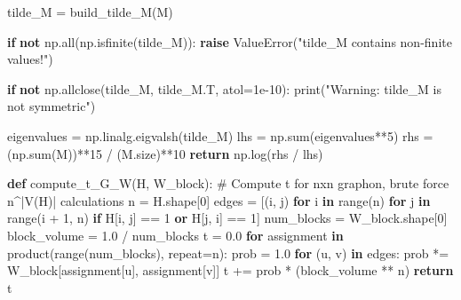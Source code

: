 \documentclass[
  letterpaper,
  DIV=11,
  numbers=noendperiod]{scrartcl}
\newenvironment{Shaded}{\begin{snugshade}}{\end{snugshade}}
\newcommand{\BuiltInTok}[1]{\textcolor[rgb]{0.00,0.23,0.31}{#1}}
\newcommand{\CommentTok}[1]{\textcolor[rgb]{0.37,0.37,0.37}{#1}}
\newcommand{\ControlFlowTok}[1]{\textcolor[rgb]{0.00,0.23,0.31}{\textbf{#1}}}
\newcommand{\DecValTok}[1]{\textcolor[rgb]{0.68,0.00,0.00}{#1}}
\newcommand{\FloatTok}[1]{\textcolor[rgb]{0.68,0.00,0.00}{#1}}
\newcommand{\KeywordTok}[1]{\textcolor[rgb]{0.00,0.23,0.31}{\textbf{#1}}}
\newcommand{\NormalTok}[1]{\textcolor[rgb]{0.00,0.23,0.31}{#1}}
\newcommand{\OperatorTok}[1]{\textcolor[rgb]{0.37,0.37,0.37}{#1}}
\newcommand{\PreprocessorTok}[1]{\textcolor[rgb]{0.68,0.00,0.00}{#1}}
\newcommand{\StringTok}[1]{\textcolor[rgb]{0.13,0.47,0.30}{#1}}
\begin{document}
\begin{Shaded}
\begin{Highlighting}[]
\NormalTok{    tilde\_M }\OperatorTok{=}\NormalTok{ build\_tilde\_M(M)}

    \ControlFlowTok{if} \KeywordTok{not}\NormalTok{ np.}\BuiltInTok{all}\NormalTok{(np.isfinite(tilde\_M)):}
        \ControlFlowTok{raise} \PreprocessorTok{ValueError}\NormalTok{(}\StringTok{"tilde\_M contains non{-}finite values!"}\NormalTok{)}

    \ControlFlowTok{if} \KeywordTok{not}\NormalTok{ np.allclose(tilde\_M, tilde\_M.T, atol}\OperatorTok{=}\FloatTok{1e{-}10}\NormalTok{):}
        \BuiltInTok{print}\NormalTok{(}\StringTok{"Warning: tilde\_M is not symmetric"}\NormalTok{)}

\NormalTok{    eigenvalues }\OperatorTok{=}\NormalTok{ np.linalg.eigvalsh(tilde\_M)}
\NormalTok{    lhs }\OperatorTok{=}\NormalTok{ np.}\BuiltInTok{sum}\NormalTok{(eigenvalues}\OperatorTok{**}\DecValTok{5}\NormalTok{)}
\NormalTok{    rhs }\OperatorTok{=}\NormalTok{ (np.}\BuiltInTok{sum}\NormalTok{(M))}\OperatorTok{**}\DecValTok{15} \OperatorTok{/}\NormalTok{ (M.size)}\OperatorTok{**}\DecValTok{10}
    \ControlFlowTok{return}\NormalTok{ np.log(rhs }\OperatorTok{/}\NormalTok{ lhs)}

\KeywordTok{def}\NormalTok{ compute\_t\_G\_W(H, W\_block):}
    \CommentTok{\# Compute t for nxn graphon, brute force n\^{}|V(H)| calculations}
\NormalTok{    n }\OperatorTok{=}\NormalTok{ H.shape[}\DecValTok{0}\NormalTok{]}
\NormalTok{    edges }\OperatorTok{=}\NormalTok{ [(i, j) }\ControlFlowTok{for}\NormalTok{ i }\KeywordTok{in} \BuiltInTok{range}\NormalTok{(n) }\ControlFlowTok{for}\NormalTok{ j }\KeywordTok{in} \BuiltInTok{range}\NormalTok{(i }\OperatorTok{+} \DecValTok{1}\NormalTok{, n) }\ControlFlowTok{if}\NormalTok{ H[i, j] }\OperatorTok{==} \DecValTok{1} \KeywordTok{or}\NormalTok{ H[j, i] }\OperatorTok{==} \DecValTok{1}\NormalTok{]}
\NormalTok{    num\_blocks }\OperatorTok{=}\NormalTok{ W\_block.shape[}\DecValTok{0}\NormalTok{]}
\NormalTok{    block\_volume }\OperatorTok{=} \FloatTok{1.0} \OperatorTok{/}\NormalTok{ num\_blocks}
\NormalTok{    t }\OperatorTok{=} \FloatTok{0.0}
    \ControlFlowTok{for}\NormalTok{ assignment }\KeywordTok{in}\NormalTok{ product(}\BuiltInTok{range}\NormalTok{(num\_blocks), repeat}\OperatorTok{=}\NormalTok{n):}
\NormalTok{        prob }\OperatorTok{=} \FloatTok{1.0}
        \ControlFlowTok{for}\NormalTok{ (u, v) }\KeywordTok{in}\NormalTok{ edges:}
\NormalTok{            prob }\OperatorTok{*=}\NormalTok{ W\_block[assignment[u], assignment[v]]}
\NormalTok{        t }\OperatorTok{+=}\NormalTok{ prob }\OperatorTok{*}\NormalTok{ (block\_volume }\OperatorTok{**}\NormalTok{ n)}
    \ControlFlowTok{return}\NormalTok{ t}


\end{Highlighting}
\end{Shaded}
\end{document}
